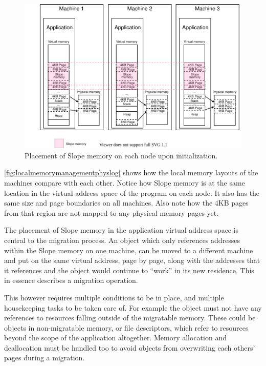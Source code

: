 \begin{figure}[t]
\centering
{}
\includegraphics[width=1\textwidth]{local-memory-management-phys-log.drawio}
\caption{
    Placement of Slope memory on each node upon initialization.
}
\label{fig:localmemorymanagementphyslog}
\end{figure}

\autoref{fig:localmemorymanagementphyslog} shows how the local memory layouts
of the machines compare with each other. Notice how Slope memory is at the
same location in the virtual address space of the program on each node.
It also has the same size and page boundaries on all machines. Also note how
the 4KB pages from that region are not mapped to any physical memory pages
yet.

The placement of Slope memory in the application virtual address space is
central to the migration process. An object which only references addresses
within the Slope memory on one machine, can be moved to a different machine
and put on the same virtual address, page by page, along with the addresses
that it references and the object would continue to ``work'' in its new
residence. This in essence describes a migration operation.

This however requires multiple conditions to be in place, and multiple
housekeeping tasks to be taken care of. For example the object must not have
any references to resources falling outside of the migratable memory. These
could be objects in non-migratable memory, or file descriptors, which refer
to resources beyond the scope of the application altogether. Memory allocation
and deallocation must be handled too to avoid objects from overwriting each
others' pages during a migration.


